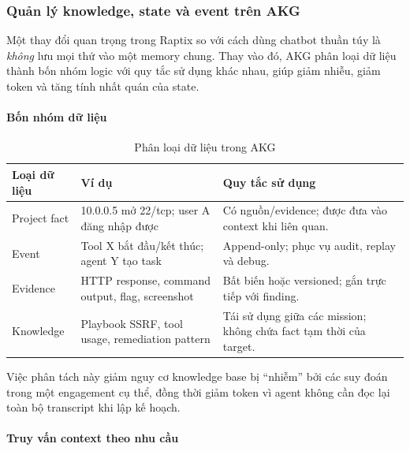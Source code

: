 
\subsubsection{Quản lý knowledge, state và event trên AKG}
\label{sec:quan-ly-state}

Một thay đổi quan trọng trong Raptix so với cách dùng chatbot thuần túy là \emph{không} lưu mọi thứ vào một memory chung. Thay vào đó, AKG phân loại dữ liệu thành bốn nhóm logic với quy tắc sử dụng khác nhau, giúp giảm nhiễu, giảm token và tăng tính nhất quán của state.

\paragraph{Bốn nhóm dữ liệu}

\begin{table}[H]
\centering
\caption{Phân loại dữ liệu trong AKG}
\label{tab:phan-loai-du-lieu}
\small
\renewcommand{\arraystretch}{1.3}
\begin{tabular}{|p{2.6cm}|p{5.5cm}|p{7.5cm}|}
\hline
\textbf{Loại dữ liệu} & \textbf{Ví dụ} & \textbf{Quy tắc sử dụng} \\
\hline
Project fact & 10.0.0.5 mở 22/tcp; user A đăng nhập được & Có nguồn/evidence; được đưa vào context khi liên quan. \\
\hline
Event & Tool X bắt đầu/kết thúc; agent Y tạo task & Append-only; phục vụ audit, replay và debug. \\
\hline
Evidence & HTTP response, command output, flag, screenshot & Bất biến hoặc versioned; gắn trực tiếp với finding. \\
\hline
Knowledge & Playbook SSRF, tool usage, remediation pattern & Tái sử dụng giữa các mission; không chứa fact tạm thời của target. \\
\hline
\end{tabular}
\end{table}

Việc phân tách này giảm nguy cơ knowledge base bị ``nhiễm'' bởi các suy đoán trong một engagement cụ thể, đồng thời giảm token vì agent không cần đọc lại toàn bộ transcript khi lập kế hoạch.

\paragraph{Truy vấn context theo nhu cầu}

